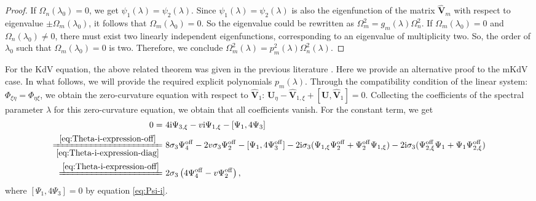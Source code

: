 \documentclass[11pt,reqno]{amsart}
\newcommand{\ii}{\mathrm{i}}
\newcommand{\off}{\mathrm{off}}
\numberwithin{equation}{section}
\begin{document}
\begin{proof-kerin}
\begin{proof}
		If $ \Omega_n(\lambda_0)=0$, we get $\psi_1(\lambda)=\psi_2(\lambda)$.
		Since $\psi_1(\lambda)=\psi_2(\lambda)$ is also the eigenfunction of the matrix $\hat{\mathbf{V}}_m$ with respect to eigenvalue $\pm \Omega_{m}(\lambda_0)$, 
		it follows that $\Omega_m(\lambda_0)=0$. So  the eigenvalue could be rewritten as $\Omega_m^2=g_m(\lambda)\Omega_n^2$.
		If $\Omega_m(\lambda_0)=0$ and $\Omega_n(\lambda_0) \neq 0$, 
		there must exist two linearly independent eigenfunctions, corresponding to an eigenvalue of multiplicity two.
		So, the order of $\lambda_0$ such that $\Omega_m(\lambda_0)=0$ is two. Therefore, we conclude $\Omega_m^2(\lambda)=p_m^2(\lambda) \Omega_n^2(\lambda)$.
		\end{proof}
For the KdV equation, the above related theorem was given in the previous literature \cite{NivalaD-2010periodic}. Here we provide an alternative proof to the mKdV case. In what follows, we will provide the required explicit polynomials $p_m(\lambda)$.
Through the compatibility condition of the linear system: $\Phi_{\xi\eta}=\Phi_{\eta\xi}$, we obtain the zero-curvature equation with respect to $\hat{\mathbf{V}}_{1}$: $\mathbf{U}_{\eta}-\hat{\mathbf{V}}_{1,\xi}+[\mathbf{U},\hat{\mathbf{V}}_{1}]=0$. 
Collecting the coefficients of the spectral parameter $\lambda$ for this zero-curvature equation, we obtain that all coefficients vanish.
For the constant term, we get
\begin{equation}\label{eq:stationary-2}
	   \begin{split}
		0=&\ 4\ii \Psi_{3,\xi}-v\ii \Psi_{1,\xi} -[\Psi_1,4\Psi_{3}]\\	
		\xlongequal[\eqref{eq:Theta-i-expression-diag}]{\eqref{eq:Theta-i-expression-off}}&\ 
		 8\sigma_3\Psi_4^{\off}-2v\sigma_3\Psi_2^{\off}-[\Psi_1,4\Psi_{3}^{\off}]-2\ii \sigma_3(\Psi_{1,\xi}\Psi_2^{\off}+\Psi_2^{\off}\Psi_{1,\xi})-2\ii \sigma_3(\Psi_{2,\xi}^{\off}\Psi_1+\Psi_1\Psi_{2,\xi}^{\off}) \\
		\xlongequal{\eqref{eq:Theta-i-expression-off}}&\ 2\sigma_3\left(4\Psi_4^{\off}-v\Psi_2^{\off}\right),
	\end{split}
\end{equation}
where $[\Psi_1,4\Psi_3]=0$ by equation \eqref{eq:Psi-i}.

\end{proof-kerin}
\end{document}
